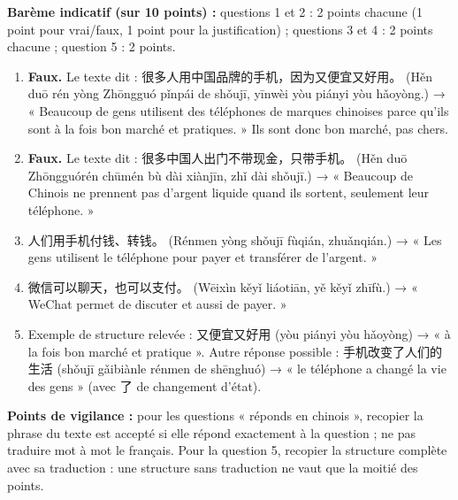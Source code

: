 \documentclass[11pt]{article}
\begin{document}
\begin{corrige}
\textbf{Barème indicatif (sur 10 points) :} questions 1 et 2 : 2 points chacune (1 point pour vrai/faux, 1 point pour la justification) ; questions 3 et 4 : 2 points chacune ; question 5 : 2 points.

\begin{enumerate}
\item \textbf{Faux.} Le texte dit : 很多人用中国品牌的手机，因为又便宜又好用。 (Hěn duō rén yòng Zhōngguó pǐnpái de shǒujī, yīnwèi yòu piányi yòu hǎoyòng.) → « Beaucoup de gens utilisent des téléphones de marques chinoises parce qu'ils sont à la fois bon marché et pratiques. » Ils sont donc bon marché, pas chers.
\item \textbf{Faux.} Le texte dit : 很多中国人出门不带现金，只带手机。 (Hěn duō Zhōngguórén chūmén bù dài xiànjīn, zhǐ dài shǒujī.) → « Beaucoup de Chinois ne prennent pas d'argent liquide quand ils sortent, seulement leur téléphone. »
\item 人们用手机付钱、转钱。 (Rénmen yòng shǒujī fùqián, zhuǎnqián.) → « Les gens utilisent le téléphone pour payer et transférer de l'argent. »
\item 微信可以聊天，也可以支付。 (Wēixìn kěyǐ liáotiān, yě kěyǐ zhīfù.) → « WeChat permet de discuter et aussi de payer. »
\item Exemple de structure relevée : 又便宜又好用 (yòu piányi yòu hǎoyòng) → « à la fois bon marché et pratique ». Autre réponse possible : 手机改变了人们的生活 (shǒujī gǎibiànle rénmen de shēnghuó) → « le téléphone a changé la vie des gens » (avec 了 de changement d'état).
\end{enumerate}
\textbf{Points de vigilance :} pour les questions « réponds en chinois », recopier la phrase du texte est accepté si elle répond exactement à la question ; ne pas traduire mot à mot le français. Pour la question 5, recopier la structure complète avec sa traduction : une structure sans traduction ne vaut que la moitié des points.
\end{corrige}
\end{document}
